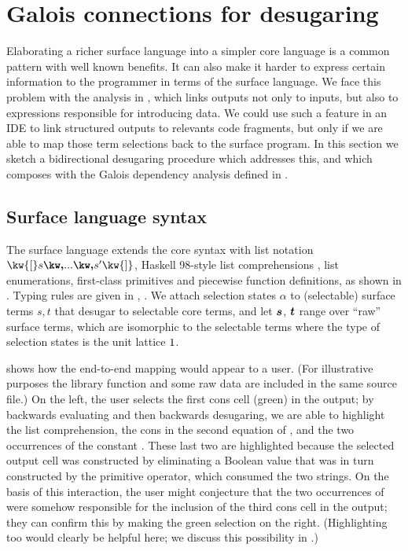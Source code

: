 \newpage
\section{Galois connections for desugaring}
\label{sec:surface-language}

Elaborating a richer surface language into a simpler core language is a common pattern with well known benefits. It can also make it harder to express certain information to the programmer in terms of the surface language. We face this problem with the analysis in , which links outputs not only to inputs, but also to expressions responsible for introducing data. We could use such a feature in an IDE to link structured outputs to relevants code fragments, but only if we are able to map those term selections back to the surface program. In this section we sketch a bidirectional desugaring procedure which addresses this, and which composes with the Galois dependency analysis defined in .



\subsection{Surface language syntax}

The surface language \OurLanguage{} extends the core syntax with list notation $\kw{[} s \comma \ldots \comma s' \kw{]}$, Haskell 98-style list comprehensions \cite{peytonJones03}, list enumerations, first-class primitives and piecewise function definitions, as shown in . Typing rules are \ifappendices given in , \else \IncludedWithSupplementaryMaterial\fi. We attach selection states $\alpha$ to (selectable) surface terms $s, t$ that desugar to selectable core terms, and let $\bm{s}$, $\bm{t}$ range over ``raw'' surface terms, which are isomorphic to the selectable terms where the type of selection states is the unit lattice $1$.

 shows how the end-to-end mapping would appear to a user. (For illustrative purposes the library function  and some raw data are included in the same source file.) On the left, the user selects the first cons cell (green) in the output; by backwards evaluating and then backwards desugaring, we are able to highlight the list comprehension, the cons in the second equation of , and the two occurrences of the constant . These last two are highlighted because the selected output cell was constructed by eliminating a Boolean value that was in turn constructed by the primitive \kw{==} operator, which consumed the two strings. On the basis of this interaction, the user might conjecture that the two occurrences of  were somehow responsible for the inclusion of the third cons cell in the output; they can confirm this by making the green selection on the right. (Highlighting \kw{==} too would clearly be helpful here; we discuss this possibility in .)

